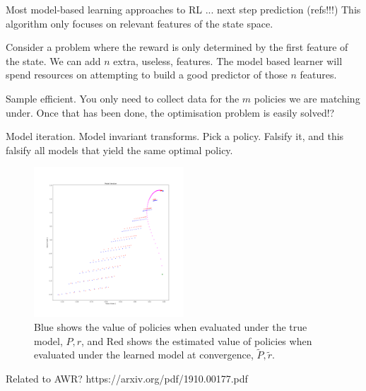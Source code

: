 Most model-based learning approaches to RL ... next step prediction (refs!!!)
This algorithm only focuses on relevant features of the state space.

Consider a problem where the reward is only determined by the first feature of the state. We can add $n$ extra, useless, features.
The model based learner will spend resources on attempting to build a good predictor of those $n$ features.

Sample efficient. You only need to collect data for the $m$ policies we are matching under.
Once that has been done, the optimisation problem is easily solved!?

Model iteration. Model invariant transforms. Pick a policy. Falsify it,
and this falsify all models that yield the same optimal policy.

\begin{figure}
\centering
\includegraphics[width=0.5\textwidth,height=0.5\textheight]{../../pictures/figures/model_iteration.png}
\caption{Blue shows the value of policies when evaluated under the true model, $P, r$,
and Red shows the estimated value of policies when evaluated under the learned model at convergence, $\tilde P, \tilde r$.}
\end{figure}


Related to AWR? https://arxiv.org/pdf/1910.00177.pdf
